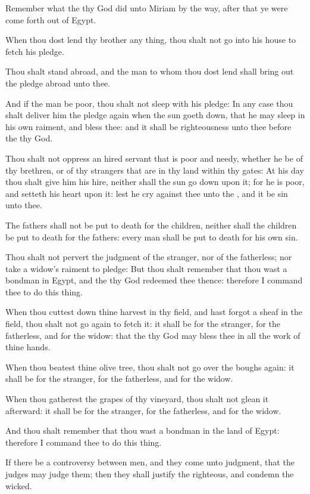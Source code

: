\Verse Remember what the \LORD thy God did unto Miriam by the way, after that ye were come forth out of Egypt.

\Verse When thou dost lend thy brother any thing, thou shalt not go into his house to fetch his pledge.

\Verse Thou shalt stand abroad, and the man to whom thou dost lend shall bring out the pledge abroad unto thee.

\Verse And if the man be poor, thou shalt not sleep with his pledge: \Verse In any case thou shalt deliver him the pledge again when the sun goeth down, that he may sleep in his own raiment, and bless thee: and it shall be righteousness unto thee before the \LORD thy God.

\Verse Thou shalt not oppress an hired servant that is poor and needy, whether he be of thy brethren, or of thy strangers that are in thy land within thy gates: \Verse At his day thou shalt give him his hire, neither shall the sun go down upon it; for he is poor, and setteth his heart upon it: lest he cry against thee unto the \LORD, and it be sin unto thee.

\Verse The fathers shall not be put to death for the children, neither shall the children be put to death for the fathers: every man shall be put to death for his own sin.

\Verse Thou shalt not pervert the judgment of the stranger, nor of the fatherless; nor take a widow's raiment to pledge: \Verse But thou shalt remember that thou wast a bondman in Egypt, and the \LORD thy God redeemed thee thence: therefore I command thee to do this thing.

\Verse When thou cuttest down thine harvest in thy field, and hast forgot a sheaf in the field, thou shalt not go again to fetch it: it shall be for the stranger, for the fatherless, and for the widow: that the \LORD thy God may bless thee in all the work of thine hands.

\Verse When thou beatest thine olive tree, thou shalt not go over the boughs again: it shall be for the stranger, for the fatherless, and for the widow.

\Verse When thou gatherest the grapes of thy vineyard, thou shalt not glean it afterward: it shall be for the stranger, for the fatherless, and for the widow.

\Verse And thou shalt remember that thou wast a bondman in the land of Egypt: therefore I command thee to do this thing.


\Chapter
\Verse If there be a controversy between men, and they come unto judgment, that the judges may judge them; then they shall justify the righteous, and condemn the wicked.

